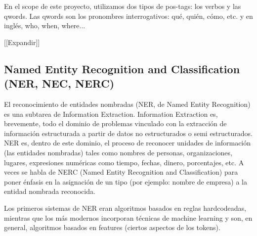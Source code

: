 


\bigskip

En el scope de este proyecto, utilizamos dos tipos de pos-tags: los
verbos y las qwords. Las qwords son los pronombres interrogativos:
qu\'e, qui\'en, c\'omo, etc. y en ingl\'es, who, when, where...\newline

[[Expandir]]

\subsection{Named Entity Recognition and Classification (NER, NEC, NERC)}
\label{subsec:nerc}
El reconocimiento de entidades nombradas (NER, de Named Entity
Recognition) es una subtarea de Information Extraction. Information
Extraction es, brevemente, todo el dominio de problemas vinculado con
la extracci\'on de informaci\'on estructurada a partir de datos no
estructurados o semi estructurados. NER es, dentro de este dominio, el
proceso de reconocer unidades de informaci\'on (las entidades
nombradas) tales como nombres de personas, organizaciones, lugares,
expresiones num\'ericas como tiempo, fechas, dinero, porcentajes, etc.
A veces se habla de NERC (Named Entity Recognition and Classification)
para poner \'enfasis en la asignaci\'on de un tipo (por ejemplo: nombre
de empresa) a la entidad nombrada reconocida.

Los primeros sistemas de NER eran algoritmos basados en reglas
hardcodeadas, mientras que los m\'as modernos incorporan t\'ecnicas de
machine learning y son, en general, algoritmos basados en features
(ciertos aspectos de los tokens).

